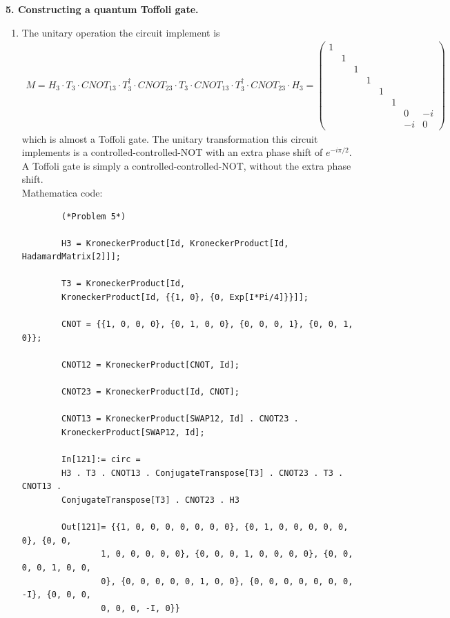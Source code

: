 \documentclass{article}
\theoremstyle{definition}
\begin{document}
\begin{enumerate}[label=(\alph*)]
	
	
\end{enumerate}



\noindent \textbf{5. Constructing a quantum Toffoli gate.}

\begin{enumerate}[label=(\alph*)]
	\item The unitary operation the circuit implement is 
	\begin{align*}
		M 
		= H_3 \cdot  T_3 \cdot  CNOT_{13} \cdot T_3^\dagger \cdot CNOT_{23} \cdot T_3 \cdot CNOT_{13} \cdot T_3^\dagger \cdot CNOT_{23} \cdot H_3 
		= \begin{pmatrix}
			1&&&&&&& \\
			&1&&&&&& \\
			&&1&&&&& \\
			&&&1&&&& \\
			&&&&1&&& \\
			&&&&&1&& \\
			&&&&&&0&-i \\
			&&&&&&-i&0 
		\end{pmatrix}
	\end{align*}
	which is almost a Toffoli gate. The unitary transformation this circuit implements is a controlled-controlled-NOT with an extra phase shift of $e^{-i\pi/2}$. A Toffoli gate is simply a controlled-controlled-NOT, without the extra phase shift. \\

	Mathematica code:
	\begin{lstlisting}
		(*Problem 5*)
		
		H3 = KroneckerProduct[Id, KroneckerProduct[Id, HadamardMatrix[2]]];
		
		T3 = KroneckerProduct[Id, 
		KroneckerProduct[Id, {{1, 0}, {0, Exp[I*Pi/4]}}]];
		
		CNOT = {{1, 0, 0, 0}, {0, 1, 0, 0}, {0, 0, 0, 1}, {0, 0, 1, 0}};
		
		CNOT12 = KroneckerProduct[CNOT, Id];
		
		CNOT23 = KroneckerProduct[Id, CNOT];
		
		CNOT13 = KroneckerProduct[SWAP12, Id] . CNOT23 . 
		KroneckerProduct[SWAP12, Id];
		
		In[121]:= circ = 
		H3 . T3 . CNOT13 . ConjugateTranspose[T3] . CNOT23 . T3 . CNOT13 . 
		ConjugateTranspose[T3] . CNOT23 . H3
		
		Out[121]= {{1, 0, 0, 0, 0, 0, 0, 0}, {0, 1, 0, 0, 0, 0, 0, 0}, {0, 0, 
				1, 0, 0, 0, 0, 0}, {0, 0, 0, 1, 0, 0, 0, 0}, {0, 0, 0, 0, 1, 0, 0, 
				0}, {0, 0, 0, 0, 0, 1, 0, 0}, {0, 0, 0, 0, 0, 0, 0, -I}, {0, 0, 0, 
				0, 0, 0, -I, 0}}
	\end{lstlisting}


\end{enumerate}
\end{document}
